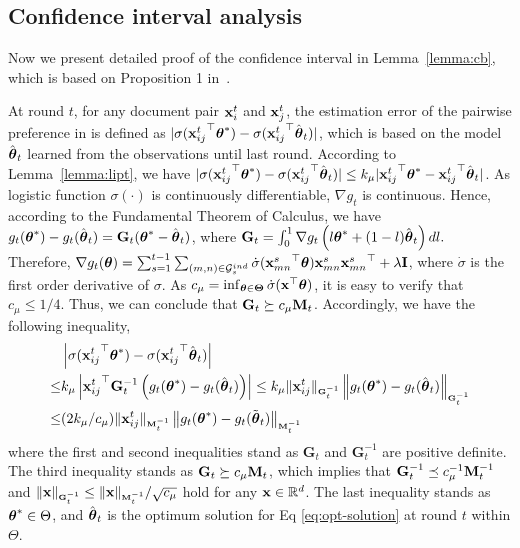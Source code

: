 \subsection{Confidence interval analysis}
\label{sec:cb}
Now we present detailed proof of the confidence interval in Lemma~\ref{lemma:cb}, which is based on Proposition 1 in~\cite{filippi2010parametric}.

At round $t$, for any document pair $\mathbf{x}^t_i$ and $\mathbf{x}^t_j$, the estimation error of the pairwise preference in \model{} is defined as $|\sigma({{\mathbf{x}_{ij}^t}}^\top\boldsymbol{\theta}^*) - \sigma({{\mathbf{x}_{ij}^t}}^\top\hat{\boldsymbol{\theta}}_t)|$, which is based on the model $\hat{\boldsymbol{\theta}}_t$ learned from the observations until last round. According to Lemma~\ref{lemma:lipt}, we have $|\sigma({{\mathbf{x}_{ij}^t}}^\top\boldsymbol{\theta}^*) - \sigma({{\mathbf{x}_{ij}^t}}^\top\hat{\boldsymbol{\theta}}_t)| \leq k_{\mu}|{{\mathbf{x}_{ij}^t}}^\top \boldsymbol{\theta}^* - {{\mathbf{x}_{ij}^t}}^\top\hat{\boldsymbol{\theta}}_t|$. As logistic function $\sigma(\cdot)$ is continuously differentiable, $\nabla g_t$ is continuous. Hence, according to the Fundamental Theorem of Calculus, we have $g_t(\boldsymbol{\theta}^*) - g_t(\hat{\boldsymbol{\theta}}_t) = \mathbf{G}_t(\boldsymbol{\theta}^* - \hat{\boldsymbol{\theta}}_t)$, where $\mathbf{G}_t = \int _0^1\nabla g_t \left(l\boldsymbol{\theta}^* + (1 - l)\hat{\boldsymbol{\theta}}_t\right) dl.$ Therefore, $\nabla g_t(\boldsymbol{\theta}) = \sum_{s=1}^{t-1}\sum_{(m, n)\in \mathcal{G}_s^{ind}} \dot\sigma({{\mathbf{x}_{mn}^s}}^\top\boldsymbol{\theta}) {{\mathbf{x}_{mn}^s}}{{\mathbf{x}_{mn}^s}}^\top + \lambda\mathbf{I}$, where $\dot{\sigma}$ is the first order derivative of $\sigma$. As $c_{\mu} = \inf_{\boldsymbol{\theta} \in \boldsymbol{\Theta}} \dot{\sigma}(\mathbf{x}^\top\boldsymbol{\theta})$, it is easy to verify that $c_{\mu} \leq 1/4$. Thus, we can conclude that $\mathbf{G}_t \succeq c_{\mu}\mathbf{M}_t$. Accordingly, we have the following inequality,
\small
\begin{align*}
    &\left|\sigma({{\mathbf{x}_{ij}^t}}^\top\boldsymbol{\theta}^*) - \sigma({{\mathbf{x}_{ij}^t}}^\top\hat{\boldsymbol{\theta}}_t) \right| \\
    \leq& k_{\mu} \left| {{\mathbf{x}_{ij}^t}}^\top \mathbf{G}_t^{-1} \left(g_t(\boldsymbol{\theta}^*) - g_t(\hat{\boldsymbol{\theta}}_t)\right) \right| \leq k_{\mu} \Vert{\mathbf{x}_{ij}^t}\Vert_{\scriptscriptstyle \mathbf{G}_t^{-1}}\left\| g_t(\boldsymbol{\theta}^*) - g_t(\hat{\boldsymbol{\theta}}_t) \right\|_{\scriptscriptstyle \mathbf{G}_t^{-1}} \\
    \leq& ({2k_{\mu}}/{c_{\mu}}) \Vert{\mathbf{x}_{ij}^t}\Vert_{\scriptscriptstyle\mathbf{M}_t^{-1}}\left\| g_t(\boldsymbol{\theta}^*) - g_t(\tilde{\boldsymbol{\theta}}_t) \right\|_{\scriptscriptstyle\mathbf{M}_t^{-1}} 
\end{align*}
\normalsize
where the first and second inequalities stand as $\mathbf{G}_t$ and $\mathbf{G}_t^{-1}$ are positive definite. The third inequality stands as $\mathbf{G}_t \succeq c_{\mu}\mathbf{M}_t$, which implies that $\mathbf{G}_t^{-1} \preceq c_{\mu}^{-1} \mathbf{M}_t^{-1}$ and $\Vert\mathbf{x}\Vert_{\scriptscriptstyle \mathbf{G}_t^{-1}} \leq \Vert\mathbf{x}\Vert_{\scriptscriptstyle \mathbf{M}_t^{-1}}/{\sqrt{c_{\mu}}}$ hold for any $\mathbf{x} \in \mathbb{R}^d$. The last inequality stands as $\boldsymbol{\theta}^* \in \Theta$, and $\hat{\boldsymbol{\theta}}_t$ is the optimum solution for Eq \eqref{eq:opt-solution} at round $t$ within $\Theta$. 

